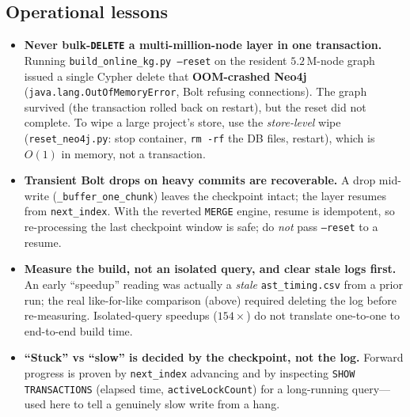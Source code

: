 \documentclass[11pt]{article}
\newcommand{\code}[1]{\texttt{#1}}
\begin{document}
\subsection{Operational lessons}
\begin{itemize}
  \item \textbf{Never bulk-\code{DELETE} a multi-million-node layer in one
  transaction.} Running \code{build\_online\_kg.py --reset} on the resident
  $5.2$\,M-node graph issued a single Cypher delete that \textbf{OOM-crashed
  Neo4j} (\code{java.lang.OutOfMemoryError}, Bolt refusing connections). The graph
  survived (the transaction rolled back on restart), but the reset did not
  complete. To wipe a large project's store, use the \emph{store-level} wipe
  (\code{reset\_neo4j.py}: stop container, \code{rm -rf} the DB files, restart),
  which is $O(1)$ in memory, not a transaction.
  \item \textbf{Transient Bolt drops on heavy commits are recoverable.} A drop
  mid-write (\code{\_buffer\_one\_chunk}) leaves the checkpoint intact; the layer
  resumes from \code{next\_index}. With the reverted \code{MERGE} engine, resume is
  idempotent, so re-processing the last checkpoint window is safe; do \emph{not}
  pass \code{--reset} to a resume.
  \item \textbf{Measure the build, not an isolated query, and clear stale logs
  first.} An early ``speedup'' reading was actually a \emph{stale}
  \code{ast\_timing.csv} from a prior run; the real like-for-like comparison
  (above) required deleting the log before re-measuring. Isolated-query speedups
  ($154\times$) do not translate one-to-one to end-to-end build time.
  \item \textbf{``Stuck'' vs ``slow'' is decided by the checkpoint, not the log.}
  Forward progress is proven by \code{next\_index} advancing and by inspecting
  \code{SHOW TRANSACTIONS} (elapsed time, \code{activeLockCount}) for a
  long-running query---used here to tell a genuinely slow write from a hang.
\end{itemize}
\end{document}
